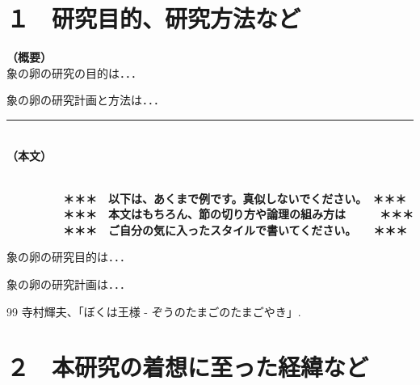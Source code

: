 \documentclass[11pt,a4j,dvipdfmx]{jarticle} 					%
\newcommand{\研究課題名}{象の卵}
\newcommand{\研究機関名}{逢坂大学}
\newcommand{\研究代表者氏名}{湯川秀樹}
\newcommand{\研究期間の最終元号年度}{5}  %
\begin{document}

\section{１　研究目的、研究方法など}

\noindent
\textbf{（概要）}\\
	象の卵の研究の目的は．．．	

	象の卵の研究計画と方法は．．．
	\vspace*{10zw}	%

\noindent
\rule{\linewidth}{1pt}\\
\noindent
\textbf{（本文）}
\JSPSInstructions	%

\textbf{\\　　　　　＊＊＊　以下は、あくまで例です。真似しないでください。　＊＊＊\\
　　　　　＊＊＊　本文はもちろん、節の切り方や論理の組み方は　　　＊＊＊\\
　　　　　＊＊＊　ご自分の気に入ったスタイルで書いてください。　　＊＊＊}

	 象の卵の研究目的は．．．

	象の卵の研究計画は．．．

		

	\vspace{1cm}
	\begin{thebibliography}{99}
		 寺村輝夫、「ぼくは王様 - ぞうのたまごのたまごやき」.
	\end{thebibliography}




\section{２　本研究の着想に至った経緯など}
\end{document}
